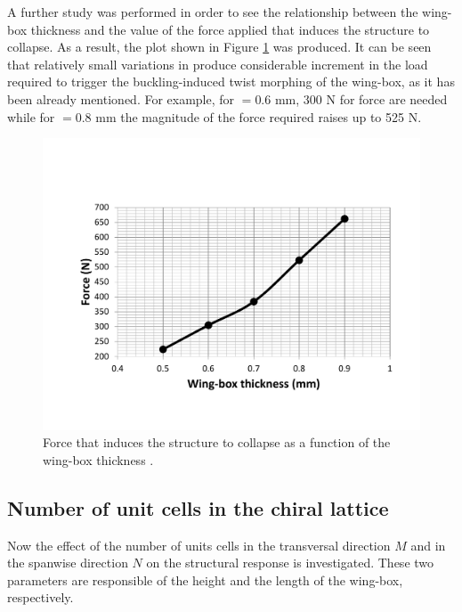     A further study was performed in order to see the relationship between the wing-box thickness and the value of the force applied that induces the structure to collapse. As a result, the plot shown in Figure \ref{fig:force_cbox_t} was produced. It can be seen that relatively small variations in \boxt produce considerable increment in the load required to trigger the buckling-induced twist morphing of the wing-box, as it has been already mentioned. For example, for \boxt$ = 0.6$ mm, 300 N for force are needed while for \boxt$ = 0.8$ mm the magnitude of the force required raises up to 525 N.

    \begin{figure}[!htpb] %
      \centering
      \includegraphics[width=0.8 \textwidth]{../figures/result-sim/cbox/force_cbox_t}
      \caption[Force that induces the structure to collapse as a function of the wing-box thickness]{Force that induces the structure to collapse as a function of the wing-box thickness \boxt.}\label{fig:force_cbox_t}
    \end{figure}

  \clearpage
  \subsection{Number of unit cells in the chiral lattice} \label{subsec:MandN_para}

    Now the effect of the number of units cells in the transversal direction $M$ and in the spanwise direction $N$ on the structural response is investigated. These two parameters are responsible of the height and the length of the wing-box, respectively.


